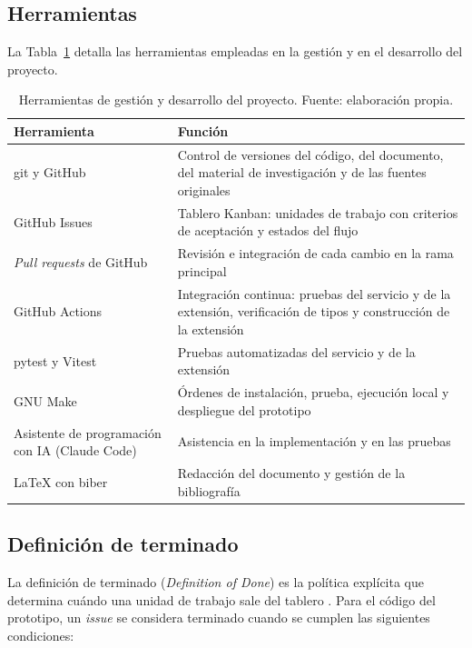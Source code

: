 \subsection{Herramientas}

La Tabla~\ref{tab:herramientas} detalla las herramientas empleadas en la gestión y en el desarrollo del proyecto.

\begin{table}[t]
  \centering
  \caption{Herramientas de gestión y desarrollo del proyecto. Fuente: elaboración propia.}
  \label{tab:herramientas}
  \begin{tabular}{p{4.3cm} p{8cm}}
    \hline
    \textbf{Herramienta} & \textbf{Función} \\
    \hline
    git y GitHub & Control de versiones del código, del documento, del material de investigación y de las fuentes originales \\
    GitHub Issues & Tablero Kanban: unidades de trabajo con criterios de aceptación y estados del flujo \\
    \textit{Pull requests} de GitHub & Revisión e integración de cada cambio en la rama principal \\
    GitHub Actions & Integración continua: pruebas del servicio y de la extensión, verificación de tipos y construcción de la extensión \\
    pytest y Vitest & Pruebas automatizadas del servicio y de la extensión \\
    GNU Make & Órdenes de instalación, prueba, ejecución local y despliegue del prototipo \\
    Asistente de programación con IA (Claude Code) & Asistencia en la implementación y en las pruebas \\
    \LaTeX{} con biber & Redacción del documento y gestión de la bibliografía \\
    \hline
  \end{tabular}
\end{table}

\subsection{Definición de terminado}
\label{sec:dod}

La definición de terminado (\textit{Definition of Done}) es la política explícita que determina cuándo una unidad de trabajo sale del tablero \parencite{SchwaberSutherland2020}. Para el código del prototipo, un \textit{issue} se considera terminado cuando se cumplen las siguientes condiciones:

